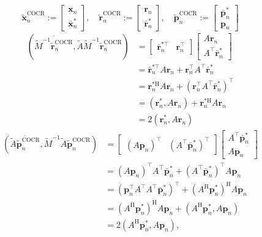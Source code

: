 \[\widetilde{\bm x}_n^{\mathrm{COCR}}:=\begin{bmatrix}\bm x_n\\\bar{\bm x}_n^{*}\end{bmatrix},\quad\widetilde{\bm r}_n^{\mathrm{COCR}}:=\begin{bmatrix}\bm r_n\\\bar{\bm r}_n^{*}\end{bmatrix},\quad\widetilde{\bm p}_n^{\mathrm{COCR}}:=\begin{bmatrix}\bar{\bm p}_n^{*}\\\bm p_n\end{bmatrix}\]
\[\begin{aligned}
(\overline{\widetilde M^{-1}\widetilde{\bm r}_n^{\mathrm{COCR}}},\widetilde A\widetilde M^{-1}\widetilde{\bm r}_n^{\mathrm{COCR}})&=\begin{bmatrix}\bar{\bm r}_n^{*\top}&\bm r_n^{\top}\end{bmatrix}\begin{bmatrix}A\bm r_n\\A^{\top}\bar{\bm r}_n^{*}\end{bmatrix}\\
&=\bar{\bm r}_n^{*\top}A\bm r_n+\bm r_n^{\top}A^{\top}\bar{\bm r}_n^{*}\\
&=\bm r_n^{*\mathrm H}A\bm r_n+(\bm r_n^{\top}A^{\top}\bar{\bm r}_n^{*})^{\top}\\
&=(\bm r_n^{*},A\bm r_n)+\bm r_n^{*\mathrm H}A\bm r_n\\
&=2(\bm r_n^{*},A\bm r_n)
\end{aligned}\]
\[\begin{aligned}
(\overline{\widetilde A\widetilde{\bm p}_n^{\mathrm{COCR}}},\widetilde M^{-1}\widetilde A\widetilde{\bm p}_n^{\mathrm{COCR}})&=\begin{bmatrix}(A\bm p_n)^{\top}&(A^{\top}\bar{\bm p}_n^{*})^{\top}\end{bmatrix}\begin{bmatrix}A^{\top}\bar{\bm p}_n^{*}\\A\bm p_n\end{bmatrix}\\
&=(A\bm p_n)^{\top}A^{\top}\bar{\bm p}_n^{*}+(A^{\top}\bar{\bm p}_n^{*})^{\top}A\bm p_n\\
&=(\bm p_n^{\top}A^{\top}A^{\top}\bar{\bm p}_n^{*})^{\top}+(A^{\mathrm H}\bm p_n^{*})^{\mathrm H}A\bm p_n\\
&=(A^{\mathrm H}\bm p_n^{*})^{\mathrm H}A\bm p_n+(A^{\mathrm H}\bm p_n^{*},A\bm p_n)\\
&=2(A^{\mathrm H}\bm p_n^{*},A\bm p_n),
\end{aligned}\]
